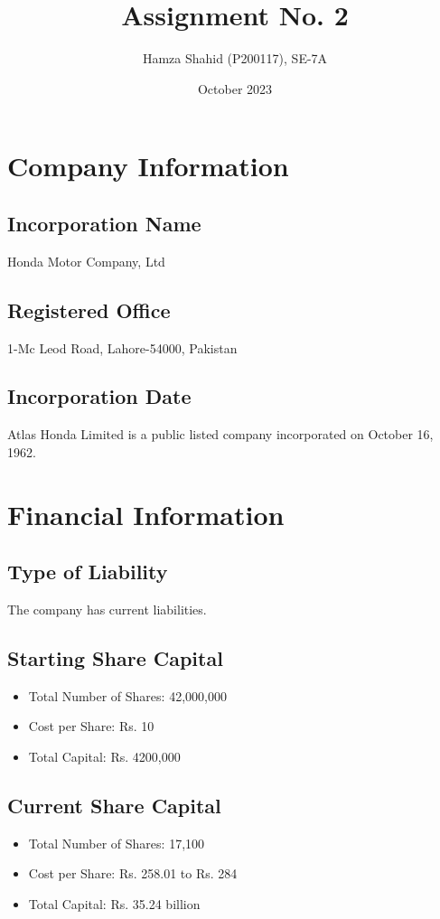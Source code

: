 \documentclass{article}
\title{Assignment No. 2}
\author{Hamza Shahid (P200117), SE-7A}
\date{October 2023}
\begin{document}
\maketitle

\section{Company Information}
\subsection{Incorporation Name}
Honda Motor Company, Ltd

\subsection{Registered Office}
1-Mc Leod Road, Lahore-54000, Pakistan

\subsection{Incorporation Date}
Atlas Honda Limited is a public listed company incorporated on October 16, 1962.

\section{Financial Information}
\subsection{Type of Liability}
The company has current liabilities.

\subsection{Starting Share Capital}
\begin{itemize}
  \item Total Number of Shares: 42,000,000
  \item Cost per Share: Rs. 10
  \item Total Capital: Rs. 4200,000
\end{itemize}

\subsection{Current Share Capital}
\begin{itemize}
  \item Total Number of Shares: 17,100
  \item Cost per Share: Rs. 258.01 to Rs. 284
  \item Total Capital: Rs. 35.24 billion
\end{itemize}
\end{document}
